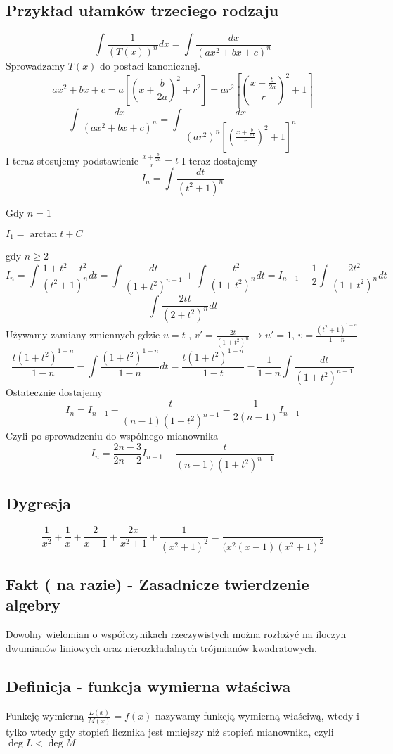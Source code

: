 \documentclass[11pt]{article}
\begin{document}
\subsection{Przykład ułamków trzeciego rodzaju}
$$\int \frac{1}{(T(x))^n}dx = \int \frac{dx}{(ax^2 + bx + c)^n} $$
Sprowadzamy $T(x)$ do postaci kanonicznej. 
$$ax^2 + bx + c = a\left[\left(x+\frac{b}{2a}\right)^2 + r^2\right]  =  ar^2 \left[\left(\frac{x + \frac{b}{2a}}{r}\right)^2 + 1\right]$$
$$\int \frac{dx}{(ax^2 + bx + c)^n} = \int \frac{dx}{(ar^2)^n\left[\left(\frac{x + \frac{b}{2a}}{r}\right)^2 + 1\right]^n} $$
I teraz stosujemy podstawienie $\frac{x+\frac{b}{2a}}{r} = t$
I teraz dostajemy
$$I_n = \int \frac{dt}{(t^2+1)^n}$$

Gdy $n = 1$ \bigskip

$I_1 = \arctan{t} + C$

\bigskip
gdy $n \geq 2$
$$I_n = \int \frac{1+t^2 - t^2}{(t^2+1)^n}dt = \int \frac{dt}{(1+t^2)^{n-1}} + \int \frac{-t^2}{(1+t^2)^n}dt = I_{n-1} - \frac{1}{2} \int \frac{2t^2}{(1+t^2)^n}dt $$
$$\int \frac{2t t}{(2+t^2)^n}dt$$
Używamy zamiany zmiennych gdzie $ u = t$ , $v' = \frac{2t}{(1+t^2)^n} \to u' = 1$, $v = \frac{(t^2+1)^{1-n}}{1-n}$
$$\frac{t(1+t^2)^{1-n}}{1-n} - \int \frac{(1+t^2)^{1-n}}{1-n}dt  = \frac{t(1+t^2)^{1-n}}{1-t} - \frac{1}{1-n}\int\frac{dt}{(1+t^2)^{n-1}}$$
Ostatecznie dostajemy
$$I_n = I_{n-1} - \frac{t}{(n-1)(1+t^2)^{n-1}} - \frac{1}{2(n-1)}I_{n-1} $$
Czyli po sprowadzeniu do wspólnego mianownika
$$I_n = \frac{2n -3}{2n -2}I_{n-1} - \frac{t}{(n-1)(1 + t^2)^{n-1}} $$

\subsection{Dygresja}
$$\frac{1}{x^2} + \frac{1}{x} + \frac{2}{x-1} + \frac{2x}{x^2+1} + \frac{1}{(x^2 +1)^2} = \frac{}{(x^2(x-1)(x^2+1)^2}$$
\subsection{Fakt ( na razie) - Zasadnicze twierdzenie algebry}
Dowolny wielomian o współczynikach rzeczywistych można rozłożyć na iloczyn dwumianów liniowych oraz nierozkładalnych trójmianów kwadratowych.

\subsection{Definicja - funkcja wymierna właściwa}
Funkcję wymierną $\frac{L(x)}{M(x)} = f(x)$ nazywamy funkcją wymierną właściwą, wtedy i tylko wtedy gdy stopień licznika jest mniejszy niż stopień mianownika, czyli $ \deg L < \deg M $
\end{document}
